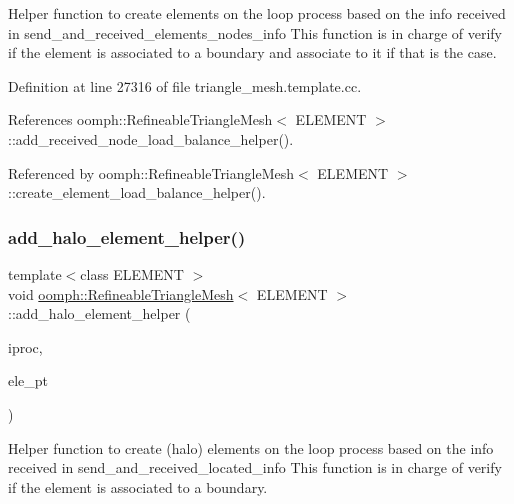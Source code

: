 Helper function to create elements on the loop process based on the info received in send\+\_\+and\+\_\+received\+\_\+elements\+\_\+nodes\+\_\+info This function is in charge of verify if the element is associated to a boundary and associate to it if that is the case. 



Definition at line 27316 of file triangle\+\_\+mesh.\+template.\+cc.



References oomph\+::\+Refineable\+Triangle\+Mesh$<$ E\+L\+E\+M\+E\+N\+T $>$\+::add\+\_\+received\+\_\+node\+\_\+load\+\_\+balance\+\_\+helper().



Referenced by oomph\+::\+Refineable\+Triangle\+Mesh$<$ E\+L\+E\+M\+E\+N\+T $>$\+::create\+\_\+element\+\_\+load\+\_\+balance\+\_\+helper().

\mbox{\label{classoomph_1_1RefineableTriangleMesh_ad08155d333cd4f57cc23818b6f328b6e}} 
\subsubsection{\texorpdfstring{add\+\_\+halo\+\_\+element\+\_\+helper()}{add\_halo\_element\_helper()}}
{\footnotesize\ttfamily template$<$class E\+L\+E\+M\+E\+NT $>$ \\
void \hyperlink{classoomph_1_1RefineableTriangleMesh}{oomph\+::\+Refineable\+Triangle\+Mesh}$<$ E\+L\+E\+M\+E\+NT $>$\+::add\+\_\+halo\+\_\+element\+\_\+helper (\begin{DoxyParamCaption}\item[{unsigned \&}]{iproc,  }\item[{Finite\+Element $\ast$}]{ele\+\_\+pt }\end{DoxyParamCaption})\hspace{0.3cm}{\ttfamily [protected]}}



Helper function to create (halo) elements on the loop process based on the info received in send\+\_\+and\+\_\+received\+\_\+located\+\_\+info This function is in charge of verify if the element is associated to a boundary. 



